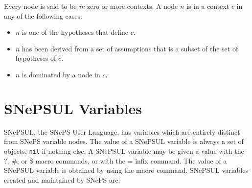 \documentclass{book}
\makeatletter
\newcommand{\ct}[1]{{\ttfamily #1}} %
\newcommand{\indexct}[1]{\index{#1@\ct{#1}}} %
\makeatother
\begin{document}
Every node is said to be {\em in} zero or
more contexts.  A node $n$ is in a context
$c$ in any of the following cases:
\begin{itemize}

\item $n$ is one of the hypotheses that define $c$.

\item $n$ has been derived from a set of assumptions that is a subset of the set of hypotheses of $c$.

\item $n$ is dominated by a node in $c$.

\end{itemize}

\section{SNePSUL Variables}\label{variablessect}
SNePSUL, the SNePS User Language, has
variables which are entirely distinct from
SNePS variable nodes.  The value of a SNePSUL variable is always a set
of objects, {\tt nil} if nothing else.  A SNePSUL variable may be
given a value with the \ct{?}\indexct{?}, \ct{\#}\indexct{\#}, or
\ct{\$}\indexct{\$} macro commands, or with the \ct{=}\indexct{=}
infix command.  The value of a SNePSUL variable is obtained by using
the \ct{*}\indexct{*} macro command.  SNePSUL variables created and
maintained by SNePS are:
\end{document}
